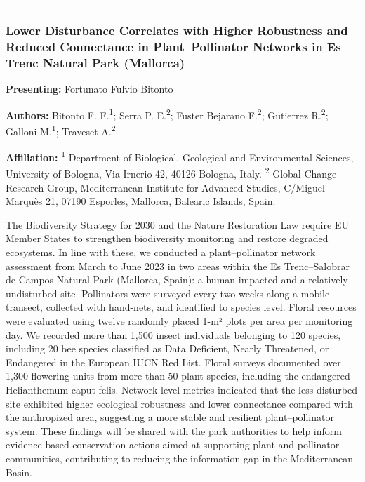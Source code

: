 \documentclass[
  letterpaper,
  DIV=11,
  numbers=noendperiod]{scrartcl}
\begin{document}
\begin{center}\rule{0.5\linewidth}{0.5pt}\end{center}

\subsubsection{Lower Disturbance Correlates with Higher Robustness and
Reduced Connectance in Plant--Pollinator Networks in Es Trenc Natural
Park
(Mallorca)}\label{lower-disturbance-correlates-with-higher-robustness-and-reduced-connectance-in-plantpollinator-networks-in-es-trenc-natural-park-mallorca}

\textbf{Presenting:} Fortunato Fulvio Bitonto

\textbf{Authors:} Bitonto F. F.\textsuperscript{1}; Serra P.
E.\textsuperscript{2}; Fuster Bejarano F.\textsuperscript{2}; Gutierrez
R.\textsuperscript{2}; Galloni M.\textsuperscript{1}; Traveset
A.\textsuperscript{2}

\textbf{Affiliation:} \textsuperscript{1} Department of Biological,
Geological and Environmental Sciences, University of Bologna, Via
Irnerio 42, 40126 Bologna, Italy. \textsuperscript{2} Global Change
Research Group, Mediterranean Institute for Advanced Studies, C/Miguel
Marquès 21, 07190 Esporles, Mallorca, Balearic Islands, Spain.

The Biodiversity Strategy for 2030 and the Nature Restoration Law
require EU Member States to strengthen biodiversity monitoring and
restore degraded ecosystems. In line with these, we conducted a
plant--pollinator network assessment from March to June 2023 in two
areas within the Es Trenc--Salobrar de Campos Natural Park (Mallorca,
Spain): a human-impacted and a relatively undisturbed site. Pollinators
were surveyed every two weeks along a mobile transect, collected with
hand-nets, and identified to species level. Floral resources were
evaluated using twelve randomly placed 1-m² plots per area per
monitoring day. We recorded more than 1,500 insect individuals belonging
to 120 species, including 20 bee species classified as Data Deficient,
Nearly Threatened, or Endangered in the European IUCN Red List. Floral
surveys documented over 1,300 flowering units from more than 50 plant
species, including the endangered Helianthemum caput-felis.
Network-level metrics indicated that the less disturbed site exhibited
higher ecological robustness and lower connectance compared with the
anthropized area, suggesting a more stable and resilient
plant--pollinator system. These findings will be shared with the park
authorities to help inform evidence-based conservation actions aimed at
supporting plant and pollinator communities, contributing to reducing
the information gap in the Mediterranean Basin.
\end{document}

